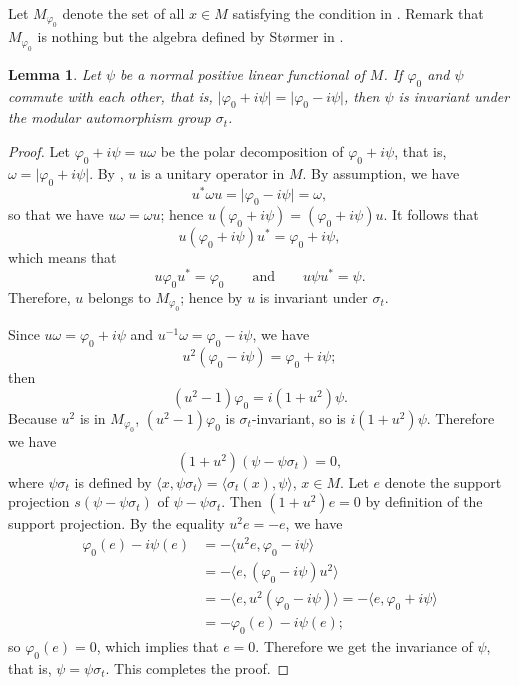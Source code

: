 \documentclass[12pt,b5paper,twoside]{article}
\theoremstyle{takesaki}
\newtheorem{lemma}{Lemma}[section]
\numberwithin{equation}{section}
\begin{document}
Let $M_{\varphi_0}$ denote the set of all $x\in M$ satisfying the
condition in .  Remark that $M_{\varphi_0}$ is nothing
but the algebra defined by St\o rmer in \cite[Lemma~4.1]{ref18}.

\begin{lemma}
\label{lem:15.9}
Let $\psi$ be a normal positive linear functional of $M$.  If
$\varphi_0$ and $\psi$ commute with each other, that is,
$\lvert\varphi_0+i\psi\rvert=\lvert\varphi_0-i\psi\rvert$, then $\psi$
is invariant under the modular automorphism group $\sigma_t$.
\end{lemma}

\begin{proof}
Let $\varphi_0+i\psi=u\omega$ be the polar decomposition of
$\varphi_0+i\psi$, that is,
$\omega=\lvert\varphi_0+i\psi\rvert$.  By , $u$ is a
unitary operator in $M$.  By assumption, we have
\[
  u^*\omega u=\lvert\varphi_0-i\psi\rvert=\omega,
\]
so that we have $u\omega=\omega u$; hence
$u(\varphi_0+i\psi)=(\varphi_0+i\psi)u$.  It follows that
\[
  u(\varphi_0+i\psi)u^*=\varphi_0+i\psi,
\]
which means that
\[
  u\varphi_0u^*=\varphi_0
  \qquad\text{and}\qquad
  u\psi u^*=\psi.
\]
Therefore, $u$ belongs to $M_{\varphi_0}$; hence by
 $u$ is invariant under $\sigma_t$.

Since $u\omega=\varphi_0+i\psi$ and
$u^{-1}\omega=\varphi_0-i\psi$, we have
\[
  u^2(\varphi_0-i\psi)=\varphi_0+i\psi;
\]
then
\[
  (u^2-1)\varphi_0=i(1+u^2)\psi.
\]
Because $u^2$ is in $M_{\varphi_0}$,
$(u^2-1)\varphi_0$ is $\sigma_t$-invariant, so is
$i(1+u^2)\psi$.  Therefore we have
\[
  (1+u^2)(\psi-\psi\sigma_t)=0,
\]
where $\psi\sigma_t$ is defined by
$\langle x,\psi\sigma_t\rangle=\langle\sigma_t(x),\psi\rangle$,
$x\in M$.  Let $e$ denote the support projection
$s(\psi-\psi\sigma_t)$ of $\psi-\psi\sigma_t$.  Then
$(1+u^2)e=0$ by definition of the support projection.  By the equality
$u^2e=-e$, we have
\begin{align*}
  \varphi_0(e)-i\psi(e)
    &=-\langle u^2e,\varphi_0-i\psi\rangle\\
    &=-\langle e,(\varphi_0-i\psi)u^2\rangle\\
    &=-\langle e,u^2(\varphi_0-i\psi)\rangle
      =-\langle e,\varphi_0+i\psi\rangle\\
    &=-\varphi_0(e)-i\psi(e);
\end{align*}
so $\varphi_0(e)=0$, which implies that $e=0$.  Therefore we get the
invariance of $\psi$, that is, $\psi=\psi\sigma_t$.  This completes the
proof.
\end{proof}
\end{document}
